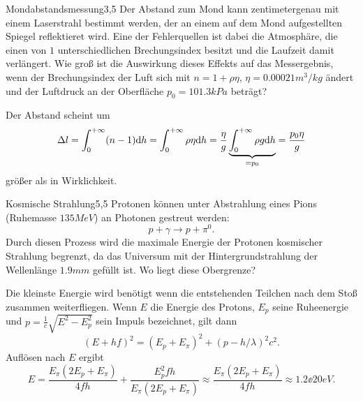 \begin{problem}{Mondabstandsmessung}{3,5}
Der Abstand zum Mond kann zentimetergenau mit einem Laserstrahl bestimmt werden, der an einem auf dem Mond aufgestellten Spiegel reflektieret wird. Eine der Fehlerquellen ist dabei die Atmosphäre, die einen von $1$ unterschiedlichen Brechungsindex besitzt und die Laufzeit damit verlängert. Wie groß ist die Auswirkung dieses Effekts auf das Messergebnis, wenn der Brechungsindex der Luft sich mit $n = 1 + \rho \eta$, $\eta = 0.00021 \unit{m^3/kg}$ ändert und der Luftdruck an der Oberfläche $p_0 = 101.3 \unit{kPa}$ beträgt?

\begin{solution}
Der Abstand scheint um
\[
\Delta l = \int_0^{+\infty} (n-1) \mathrm{d} h = \int_0^{+\infty} \rho \eta \mathrm{d} h = \frac{\eta}{g} \underbrace{\int_0^{+\infty} \rho g \mathrm{d} h}_{=p_0} = \frac{p_0 \eta}{g}
\]
größer als in Wirklichkeit.
\end{solution}
\end{problem}


\begin{problem}{Kosmische Strahlung}{5,5}
Protonen können unter Abstrahlung eines Pions (Ruhemasse $135 \unit{MeV}$) an Photonen gestreut werden:
\[
p + \gamma \rightarrow p + \pi^0.
\]
Durch diesen Prozess wird die maximale Energie der Protonen kosmischer Strahlung begrenzt, da das Universum mit der Hintergrundstrahlung der Wellenlänge $1.9 \unit{mm}$ gefüllt ist. Wo liegt diese Obergrenze?

\begin{solution}
Die kleinste Energie wird benötigt wenn die entstehenden Teilchen nach dem Stoß zusammen weiterfliegen. Wenn $E$ die Energie des Protons, $E_p$ seine Ruheenergie und $p = \frac1c \sqrt{E^2 - E_p^2}$ sein Impuls bezeichnet, gilt dann
\[
(E+hf)^2 = (E_p + E_\pi)^2 + (p- h/\lambda)^2 c^2.
\]
Auflösen nach $E$ ergibt
\[
E = \frac{E_\pi (2 E_p + E_\pi)}{4 f h} + \frac{E_p^2 f h}{E_\pi (2 E_p +E_\pi)} \approx \frac{E_\pi (2 E_p + E_\pi)}{4 f h} \approx 1.2\ee{20} \unit{eV}.
\]
\end{solution}
\end{problem}


